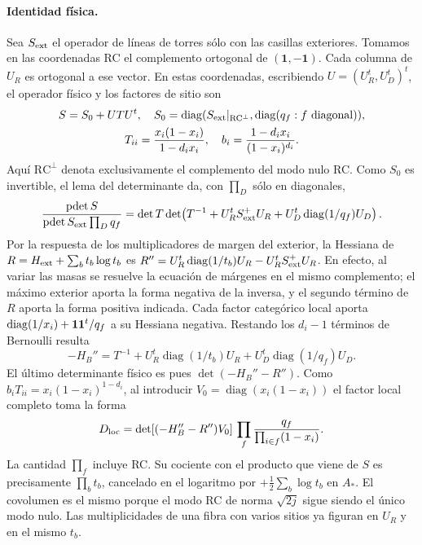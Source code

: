 \paragraph{Identidad física.}
Sea $S_{\rm ext}$ el operador de líneas de torres sólo con las casillas exteriores.
Tomamos en las coordenadas RC el complemento ortogonal de $(\mathbf1,-\mathbf1)$.
Cada columna de $U_R$ es ortogonal a ese vector. En estas coordenadas, escribiendo
$U=(U_R^t,U_D^t)^t$, el operador físico y los factores de sitio son
\[
\begin{gathered} S=S_0+UTU^t,\quad S_0=\operatorname{diag}(S_{\rm ext}|_{\rm RC^\perp},
                    \operatorname{diag}(q_f:f\ \mathrm{diagonal})),\\
 T_{ii}=\frac{x_i(1-x_i)}{1-d_i x_i},\quad b_i=\frac{1-d_i x_i}{(1-x_i)^{d_i}}.\end{gathered}
\]
Aquí $\mathrm{RC}^\perp$ denota exclusivamente el complemento del modo nulo RC.
Como $S_0$ es invertible, el lema del determinante da, con $\prod_D$ sólo en diagonales,
\[
 \frac{\operatorname{pdet}S}{\operatorname{pdet}S_{\rm ext}\prod_D q_f}
   =\det T\det\!\left(T^{-1}+U_R^t S_{\rm ext}^+U_R+
                                    U_D^t\operatorname{diag}(1/q_f)U_D\right).
\]
Por la respuesta de los multiplicadores de margen del exterior, la Hessiana de
$R=H_{\rm ext}+\sum_b t_b\log t_b$ es
$R''=U_R^t\operatorname{diag}(1/t_b)U_R-U_R^t S_{\rm ext}^+U_R$.
En efecto, al variar las masas se resuelve la ecuación de márgenes en el mismo
complemento; el máximo exterior aporta la forma negativa de la inversa, y el
segundo término de $R$ aporta la forma positiva indicada. Cada factor categórico
local aporta $\operatorname{diag}(1/x_i)+{\bf1}{\bf1}^t/q_f$ a su Hessiana negativa.
Restando los $d_i-1$ términos de Bernoulli resulta
\[
 -H_B''=T^{-1}+U_R^t\operatorname{diag}(1/t_b)U_R
                         +U_D^t\operatorname{diag}(1/q_f)U_D.
\]
El último determinante físico es pues $\det(-H_B''-R'')$. Como
$b_i T_{ii}=x_i(1-x_i)^{1-d_i}$, al introducir $V_0=\operatorname{diag}(x_i(1-x_i))$
el factor local completo toma la forma
\[
 D_{\rm loc}=\det[(-H_B''-R'')V_0]\,
                    \prod_f\frac{q_f}{\prod_{i\in f}(1-x_i)} .
\]
La cantidad $\prod_f$ incluye RC. Su cociente con el producto que viene de $S$
es precisamente $\prod_b t_b$, cancelado en el logaritmo por
$+\frac12\sum_b\log t_b$ en $A_*$. El covolumen es el mismo porque el modo RC de
norma $\sqrt{2j}$ sigue siendo el único modo nulo. Las multiplicidades de una
fibra con varios sitios ya figuran en $U_R$ y en el mismo $t_b$.
